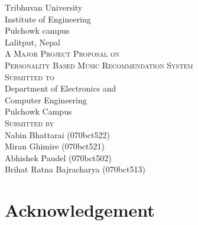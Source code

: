 \documentclass{article}
\begin{document}
\begin{titlepage}
  \begin{center}
    {\Huge\textsc Tribhuvan University}\\
    [0.03in]
    {\LARGE\textsc Institute of Engineering}\\
    [0.05in]
    {\Large\textsc Pulchowk campus}\\
    [0.02in]
    {\large\textsc Lalitput, Nepal}\\
    [2in]

    {\LARGE \textsc{A Major Project Proposal on}}\\
    [0.5cm]
    {\Large \textsc{Personality Based Music Recommendation System}}\\
    [1.8in]
    
    {\LARGE\textsc{Submitted to}}\\
    [0.05in]
    {\large Department of Electronics and }\\
    {\large Computer Engineering}\\
    {\large Pulchowk Campus}\\
    [1in]

    {\LARGE \textsc{\large Submitted by}}\\
    [0.05in]
    {\large Nabin Bhattarai (070bct522)}\\
    {\large Miran Ghimire (070bct521)}\\
    {\large Abhishek Paudel (070bct502)}\\
    {\large Brihat Ratna Bajracharya (070bct513)}\\
  \end{center}
\end{titlepage}

\setcounter{page}{2}

\section*{Acknowledgement}

\cleardoublepage

\tableofcontents
\thispagestyle{empty}
\cleardoublepage

\listoftables
\thispagestyle{empty}
\cleardoublepage
\end{document}
